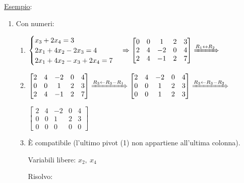 \documentclass{article}
\newcommand{\ul}[1]{\underline{#1}}
\begin{document}
\ul{Esempio}:
\begin{enumerate}
	\item Con numeri:
	      \begin{enumerate}
		      \item $\begin{cases}
				            x_3+2x_4=3       \\
				            2x_1+4x_2-2x_3=4 \\
				            2x_1+4x_2-x_3+2x_4=7
			            \end{cases}\Rightarrow
			            \begin{bmatrix}
				            0 & 0 & 1  & 2 & 3 \\
				            2 & 4 & -2 & 0 & 4 \\
				            2 & 4 & -1 & 2 & 7
			            \end{bmatrix}\xRightarrow{R_1\leftrightarrow R_2}$

		      \item $\begin{bmatrix}
				            2 & 4 & -2 & 0 & 4 \\
				            0 & 0 & 1  & 2 & 3 \\
				            2 & 4 & -1 & 2 & 7
			            \end{bmatrix}\xRightarrow{R_3\leftarrow R_3-R_1}
			            \begin{bmatrix}
				            2 & 4 & -2 & 0 & 4 \\
				            0 & 0 & 1  & 2 & 3 \\
				            0 & 0 & 1  & 2 & 3
			            \end{bmatrix}\xRightarrow{R_3\leftarrow R_3-R_2}$

		            $\begin{bmatrix}
				            2 & 4 & -2 & 0 & 4 \\
				            0 & 0 & 1  & 2 & 3 \\
				            0 & 0 & 0  & 0 & 0
			            \end{bmatrix}$
		      \item È compatibile (l'ultimo pivot (1) non appartiene all'ultima colonna).

		            Variabili libere: $x_2,\ x_4$

		            Risolvo:


\end{enumerate}
\end{enumerate}
\end{document}
